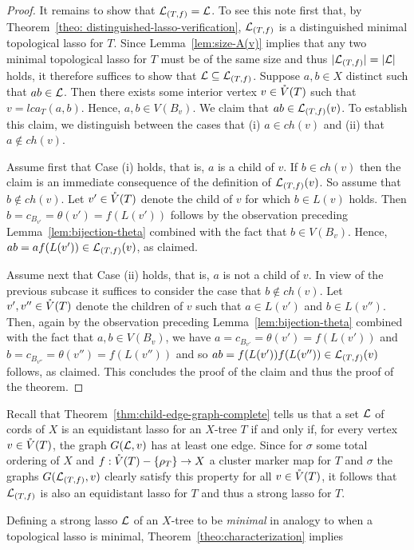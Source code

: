 \begin{proof}
  It remains to show that ${\mathcal L}_{(T,f)}={\mathcal L}$. To see this note first that, by
  Theorem~\ref{theo: distinguished-lasso-verification}, ${\mathcal L}_{(T,f)}$ is a
  distinguished minimal topological lasso for $T$. Since
  Lemma~\ref{lem:size-A(v)} implies that any two minimal topological lasso for
  $T$ must be of the same size and thus $|{\mathcal L}_{(T,f)}|=|{\mathcal L}|$ holds, it
  therefore suffices to show that ${\mathcal L}\subseteq {\mathcal L}_{(T,f)}$. Suppose $a,b\in
  X$ distinct such that $ab\in {\mathcal L}$.  Then there exists some interior vertex
  $v\in \mathring{V}(T)$ such that $v=lca_T(a,b)$.  Hence, $a,b\in V(B_v)$. We claim
  that $ab\in {\mathcal L}_{(T,f)}(v)$.  To establish this claim, we distinguish
  between the cases that (i) $a\in ch(v)$ and (ii) that $a\not\in ch(v)$.

  Assume first that Case (i) holds, that is, $a$ is a child of $v$.  If $b\in
  ch(v)$ then the claim is an immediate consequence of the definition of
  ${\mathcal L}_{(T,f)}(v)$. So assume that $b\not\in ch(v)$. Let $v'\in \mathring{V}(T)$ denote
  the child of $v$ for which $b\in L(v)$ holds. Then
  $b=c_{B_{v'}}=\theta(v')=f(L(v'))$ follows by the observation preceding
  Lemma~\ref{lem:bijection-theta} combined with the fact that $b\in
  V(B_v)$. Hence, $ab=af(L(v'))\in {\mathcal L}_{(T,f)}(v)$, as claimed.

  Assume next that Case (ii) holds, that is, $a$ is not a child of $v$.  In
  view of the previous subcase it suffices to consider the case that $b\not\in
  ch(v)$. Let $v',v''\in \mathring{V}(T)$ denote the children of $v$ such that $a\in
  L(v')$ and $b\in L(v'')$.  Then, again by the observation preceding
  Lemma~\ref{lem:bijection-theta} combined with the fact that $a,b\in V(B_v)$,
  we have $a=c_{B_{v'}}=\theta(v')=f(L(v'))$ and
  $b=c_{B_{v''}}=\theta(v'')=f(L(v''))$ and so $ab=f(L(v'))f(L(v''))\in
  {\mathcal L}_{(T,f)}(v)$ follows, as claimed.  This concludes the proof of the claim
  and thus the proof of the theorem.
\end{proof}

Recall that Theorem~\ref{thm:child-edge-graph-complete} tells us that a set
${\mathcal L}$ of cords of $X$ is an equidistant lasso for an $X$-tree $T$ if and only
if, for every vertex $v\in \mathring{V}(T)$, the graph $G({\mathcal L},v)$ has at least one
edge.  Since for $\sigma$ some total ordering of $X$ and
$f:\mathring{V}(T)-\{\rho_T\}\to X$ a cluster marker map for $T$ and $\sigma$ the
graphs $G({\mathcal L}_{(T,f)},v)$ clearly satisfy this property for all $v\in \mathring{V}(T)$,
it follows that ${\mathcal L}_{(T,f)}$ is also an equidistant lasso for $T$ and thus a
strong lasso for $T$.

Defining a strong lasso ${\mathcal L}$ of an $X$-tree to be {\em minimal} in analogy to
when a topological lasso is minimal, Theorem~\ref{theo:characterization}
implies

